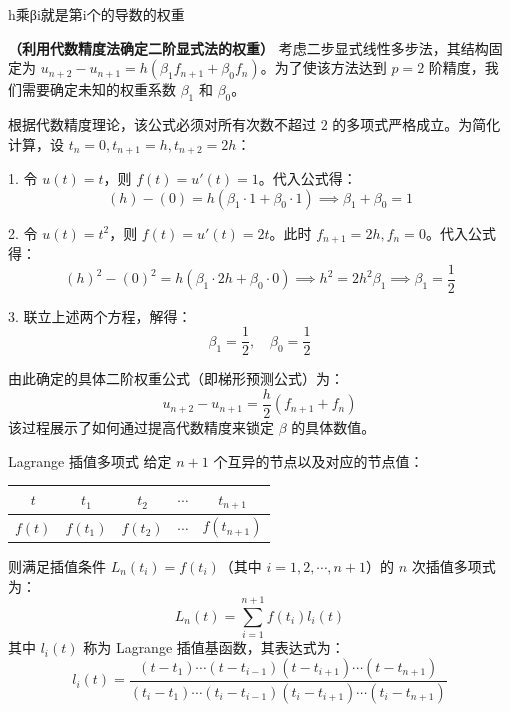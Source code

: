 \begin{dxtips}
    h乘βi就是第i个的导数的权重
\end{dxtips}
\begin{example}
    \textbf{（利用代数精度法确定二阶显式法的权重）} 考虑二步显式线性多步法，其结构固定为 $u_{n+2} - u_{n+1} = h(\beta_1 f_{n+1} + \beta_0 f_n)$。为了使该方法达到 $p=2$ 阶精度，我们需要确定未知的权重系数 $\beta_1$ 和 $\beta_0$。

    根据代数精度理论，该公式必须对所有次数不超过 $2$ 的多项式严格成立。为简化计算，设 $t_n = 0, t_{n+1} = h, t_{n+2} = 2h$：
    
    1. 令 $u(t) = t$，则 $f(t) = u'(t) = 1$。代入公式得：
    $$(h) - (0) = h(\beta_1 \cdot 1 + \beta_0 \cdot 1) \implies \beta_1 + \beta_0 = 1$$
    
    2. 令 $u(t) = t^2$，则 $f(t) = u'(t) = 2t$。此时 $f_{n+1} = 2h, f_n = 0$。代入公式得：
    $$(h)^2 - (0)^2 = h(\beta_1 \cdot 2h + \beta_0 \cdot 0) \implies h^2 = 2h^2 \beta_1 \implies \beta_1 = \frac{1}{2}$$
    
    3. 联立上述两个方程，解得：
    $$\beta_1 = \frac{1}{2}, \quad \beta_0 = \frac{1}{2}$$
    
    由此确定的具体二阶权重公式（即梯形预测公式）为：
    $$u_{n+2} - u_{n+1} = \frac{h}{2}(f_{n+1} + f_n)$$
    该过程展示了如何通过提高代数精度来锁定 $\beta$ 的具体数值。
\end{example}
\begin{definition}{Lagrange 插值多项式}
    给定 $n+1$ 个互异的节点以及对应的节点值：
    \begin{table}[htbp]
        \centering
        \begin{tabular}{c|c|c|c|c}
            $t$ & $t_1$ & $t_2$ & $\cdots$ & $t_{n+1}$ \\ \hline
            $f(t)$ & $f(t_1)$ & $f(t_2)$ & $\cdots$ & $f(t_{n+1})$
        \end{tabular}
    \end{table}
    则满足插值条件 $L_n(t_i) = f(t_i)$（其中 $i=1, 2, \cdots, n+1$）的 $n$ 次插值多项式为：
    $$L_n(t) = \sum_{i=1}^{n+1} f(t_i) l_i(t)$$
    其中 $l_i(t)$ 称为 Lagrange 插值基函数，其表达式为：
    $$l_i(t) = \frac{(t-t_1) \cdots (t-t_{i-1})(t-t_{i+1}) \cdots (t-t_{n+1})}{(t_i-t_1) \cdots (t_i-t_{i-1})(t_i-t_{i+1}) \cdots (t_i-t_{n+1})}$$
\end{definition}
